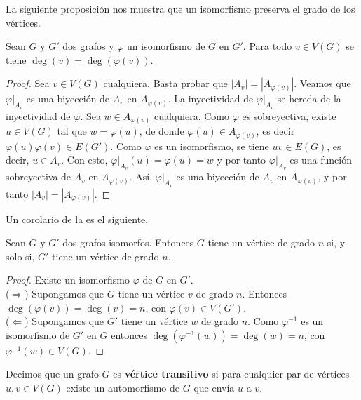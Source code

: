 La siguiente proposición nos muestra que un isomorfismo preserva el grado de los vértices.
\begin{Prop}\label{Prop:Isomorfismo_grado}
   Sean $G$ y $G'$ dos grafos y $\varphi$ un isomorfismo de $G$ en $G'$. Para todo $v\in V(G)$ se tiene $\operatorname{deg}(v)=\operatorname{deg}(\varphi(v))$.    
\end{Prop}
\begin{proof}
   Sea $v\in V(G)$ cualquiera. Basta probar que $|A_v|=|A_{\varphi(v)}|$. Veamos que $\left.\varphi\right|_{A_v}$ es una biyección de $A_v$ en $A_{\varphi(v)}$. La inyectividad de $\left.\varphi\right|_{A_v}$ se hereda de la inyectividad de $\varphi$. Sea $w\in A_{\varphi(v)}$ cualquiera. Como $\varphi$ es sobreyectiva, existe $u\in V(G)$ tal que $w=\varphi(u)$, de donde $\varphi(u)\in A_{\varphi(v)}$, es decir $\varphi(u)\varphi(v)\in E(G')$. Como $\varphi$ es un isomorfismo, se tiene $uv\in E(G)$, es decir, $u\in A_v$. Con esto, $\left.\varphi\right|_{A_v}(u)=\varphi(u)=w$ y por tanto $\left.\varphi\right|_{A_v}$ es una función sobreyectiva de $A_v$ en $A_{\varphi(v)}$. Así, $\left.\varphi\right|_{A_v}$ es una biyección de $A_v$ en $A_{\varphi(v)}$, y por tanto $|A_v|=|A_{\varphi(v)}|$.
\end{proof}
Un corolario de la  es el siguiente.
\begin{Cor}\label{Cor:Isomorfismo_grados_iguales}
   Sean $G$ y $G'$ dos grafos isomorfos. Entonces $G$ tiene un vértice de grado $n$ si, y solo si, $G'$ tiene un vértice de grado $n$. 
\end{Cor}
\begin{proof}
   Existe un isomorfismo $\varphi$ de $G$ en $G'$.\\
   ($\Rightarrow$) Supongamos que $G$ tiene un vértice $v$ de grado $n$. Entonces $\operatorname{deg} (\varphi(v)) = \operatorname{deg} (v) = n$, con $\varphi(v)\in V(G')$.\\
   ($\Leftarrow$) Supongamos que $G'$ tiene un vértice $w$ de grado $n$. Como $\varphi ^{-1}$ es un isomorfismo de $G'$ en $G$ entonces $\operatorname{deg}\left( \varphi^{-1}(w)\right)=\operatorname{deg} (w)=n$, con $\varphi ^{-1}(w)\in V(G)$.
\end{proof}
\begin{Def}
   Decimos que un grafo $G$ es \textbf{vértice transitivo} si para cualquier par de vértices $u,v\in V(G)$ existe un automorfismo de $G$ que envía $u$ a $v$.    
\end{Def}
